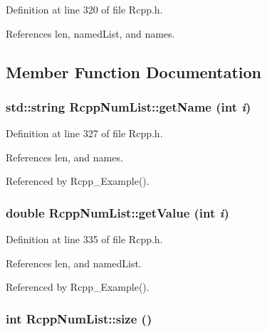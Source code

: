 Definition at line 320 of file Rcpp.h.

References len, namedList, and names.

\subsection{Member Function Documentation}
\hypertarget{classRcppNumList_246d8e534d97fbe798b8567bbfa93ca7}{
\subsubsection[getName]{\setlength{\rightskip}{0pt plus 5cm}std::string RcppNumList::getName (int {\em i})}}
\label{classRcppNumList_246d8e534d97fbe798b8567bbfa93ca7}




Definition at line 327 of file Rcpp.h.

References len, and names.

Referenced by Rcpp\_\-Example().\hypertarget{classRcppNumList_2e83950933ddc73ad64ed800f6f5e23b}{
\subsubsection[getValue]{\setlength{\rightskip}{0pt plus 5cm}double RcppNumList::getValue (int {\em i})}}
\label{classRcppNumList_2e83950933ddc73ad64ed800f6f5e23b}




Definition at line 335 of file Rcpp.h.

References len, and namedList.

Referenced by Rcpp\_\-Example().\hypertarget{classRcppNumList_18dc0660cc827bcf17d9738cb5874db7}{
\subsubsection[size]{\setlength{\rightskip}{0pt plus 5cm}int RcppNumList::size ()}}
\label{classRcppNumList_18dc0660cc827bcf17d9738cb5874db7}




